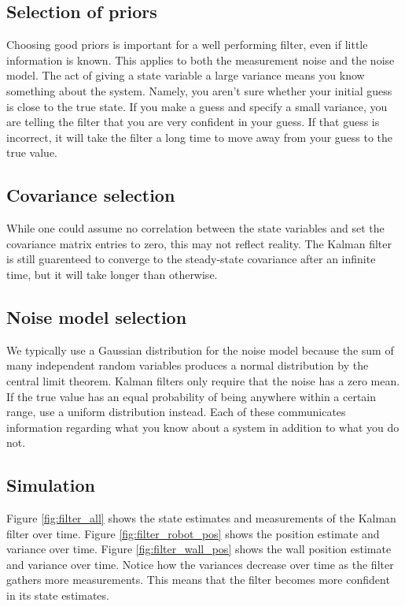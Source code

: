 \subsection{Selection of priors}

Choosing good priors is important for a well performing filter, even if little
information is known. This applies to both the measurement noise and the noise
\gls{model}. The act of giving a \gls{state} variable a large variance means you
know something about the \gls{system}. Namely, you aren't sure whether your
initial guess is close to the true \gls{state}. If you make a guess and specify
a small variance, you are telling the filter that you are very confident in your
guess. If that guess is incorrect, it will take the filter a long time to move
away from your guess to the true value.

\subsection{Covariance selection}

While one could assume no correlation between the \gls{state} variables and set
the covariance matrix entries to zero, this may not reflect reality. The Kalman
filter is still guarenteed to converge to the steady-state covariance after an
infinite time, but it will take longer than otherwise.

\subsection{Noise model selection}

We typically use a Gaussian distribution for the noise \gls{model} because the
sum of many independent random variables produces a normal distribution by the
central limit theorem. Kalman filters only require that the noise has a zero
mean. If the true value has an equal probability of being anywhere within a
certain range, use a uniform distribution instead. Each of these communicates
information regarding what you know about a system in addition to what you do
not.

\subsection{Simulation} \label{subsec:filter_simulation}

Figure \ref{fig:filter_all} shows the \gls{state} estimates and measurements of
the Kalman filter over time. Figure \ref{fig:filter_robot_pos} shows the
position estimate and variance over time. Figure \ref{fig:filter_wall_pos} shows
the wall position estimate and variance over time. Notice how the variances
decrease over time as the filter gathers more measurements. This means that the
filter becomes more confident in its \gls{state} estimates.

